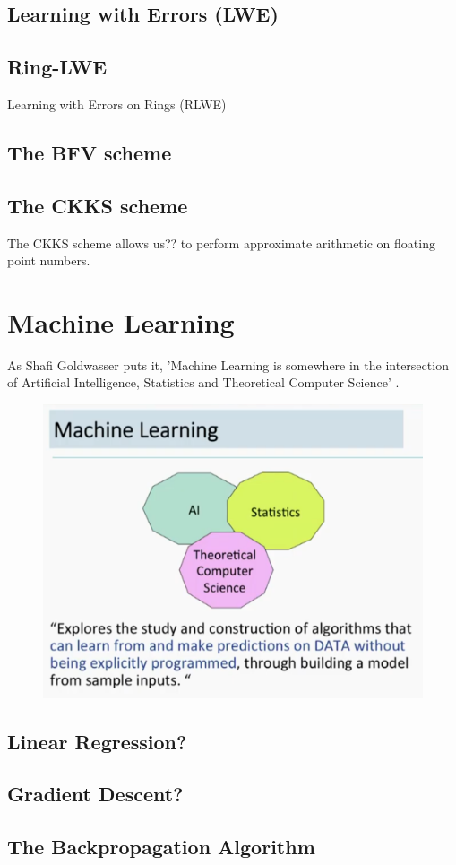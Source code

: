 \subsection{Learning with Errors (LWE)}

\subsection{Ring-LWE}
Learning with Errors on Rings (RLWE)

\subsection{The BFV scheme}
\subsection{The CKKS scheme}
The CKKS scheme allows us?? to perform approximate arithmetic on floating point numbers.

\section{Machine Learning}
As Shafi Goldwasser puts it, 'Machine Learning is somewhere in the intersection of Artificial Intelligence, Statistics and Theoretical Computer Science' \cite{goldwasserTalk2018}.

\begin{figure}
    \includegraphics[width=0.4\linewidth]{figures/what-is-machine-learning.png}
\end{figure}

\subsection{Linear Regression?}
\subsection{Gradient Descent?}
\subsection{The Backpropagation Algorithm}

